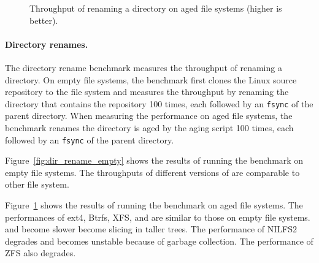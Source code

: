 \begin{figure}[t]
    \centering
    \caption[Directory rename benchmark on aged file systems]{\label{fig:dir_rename_aged}
         Throughput of renaming a directory on aged file systems (higher is better).}
\end{figure}

\paragraph{Directory renames.}
The directory rename benchmark measures the throughput of renaming a directory.
On empty file systems, the benchmark first clones the Linux source repository
to the file system and measures the throughput by renaming the directory that
contains the repository 100 times,
each followed by an \texttt{fsync} of the parent directory.
When measuring the performance on aged file systems, the benchmark renames
the directory is aged by the aging script 100 times,
each followed by an \texttt{fsync} of the parent directory.

Figure~\ref{fig:dir_rename_empty} shows the results of running the benchmark on
empty file systems.
The throughputs of different versions of \betrfs are comparable to other
file system.

Figure~\ref{fig:dir_rename_aged} shows the results of running the benchmark on
aged file systems.
The performances of ext4, Btrfs, XFS, and \betrfsThree are similar to those on
empty file systems.
\betrfsFive and \betrfsFour become slower become slicing in taller trees.
The performance of NILFS2 degrades and becomes unstable because of garbage
collection.
The performance of ZFS also degrades.

